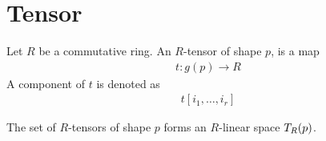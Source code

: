 \section{Tensor}
Let $R$ be a commutative ring.
An $R$-tensor of shape $p$, is a map
\begin{align*}
    t : g(p) \to R
\end{align*}
A component of $t$ is denoted as
\begin{align*}
    t[i_1, \dots, i_r]
\end{align*}

The set of $R$-tensors of shape $p$ forms an $R$-linear space ${T_{R}(p)}$.

\subsection{}
